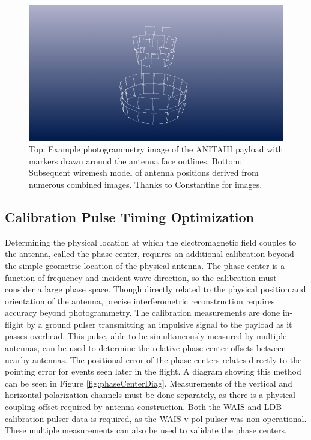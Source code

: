 \begin{figure}
	\includegraphics[width=\textwidth]{figures/KBelovANITA-III_photogrammetry_update-4}
	\caption{Top: Example photogrammetry image of the ANITAIII payload with markers drawn around the antenna face outlines.  Bottom: Subsequent wiremesh model of antenna positions derived from numerous combined images.  Thanks to Constantine for images.}
	\label{fig:photogram1}
\end{figure}
	
		
	\subsection{Calibration Pulse Timing Optimization}
		Determining the physical location at which the electromagnetic field couples to the antenna, called the phase center, requires an additional calibration beyond the simple geometric location of the physical antenna.  The phase center is a function of frequency and incident wave direction, so the calibration must consider a large phase space. Though directly related to the physical position and orientation of the antenna, precise interferometric reconstruction requires accuracy beyond photogrammetry. The calibration measurements are done in-flight by a ground pulser transmitting an impulsive signal to the payload as it passes overhead.  This pulse, able to be simultaneously measured by multiple antennas, can be used to determine the relative phase center offsets between nearby antennas.  The positional error of the phase centers relates directly to the pointing error for events seen later in the flight.  A diagram showing this method can be seen in Figure \ref{fig:phaseCenterDiag}.  Measurements of the vertical and horizontal polarization channels must be done separately, as there is a physical coupling offset required by antenna construction.  Both the WAIS and LDB calibration pulser data is required, as the WAIS v-pol pulser was non-operational.  These multiple measurements can also be used to validate the phase centers.
		
